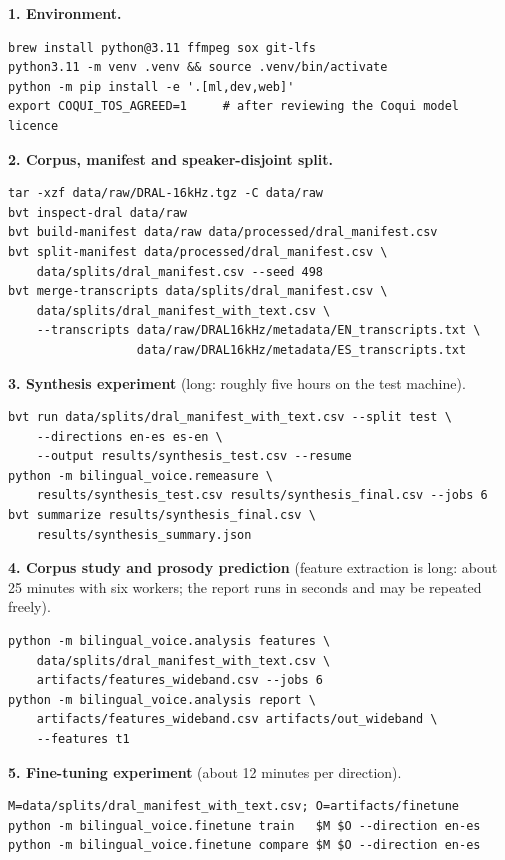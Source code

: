 \vspace{0.4\baselineskip}
{\singlespacing\small
\noindent\textbf{1. Environment.}
{\footnotesize\begin{verbatim}
brew install python@3.11 ffmpeg sox git-lfs
python3.11 -m venv .venv && source .venv/bin/activate
python -m pip install -e '.[ml,dev,web]'
export COQUI_TOS_AGREED=1     # after reviewing the Coqui model licence
\end{verbatim}}

\noindent\textbf{2. Corpus, manifest and speaker-disjoint split.}
{\footnotesize\begin{verbatim}
tar -xzf data/raw/DRAL-16kHz.tgz -C data/raw
bvt inspect-dral data/raw
bvt build-manifest data/raw data/processed/dral_manifest.csv
bvt split-manifest data/processed/dral_manifest.csv \
    data/splits/dral_manifest.csv --seed 498
bvt merge-transcripts data/splits/dral_manifest.csv \
    data/splits/dral_manifest_with_text.csv \
    --transcripts data/raw/DRAL16kHz/metadata/EN_transcripts.txt \
                  data/raw/DRAL16kHz/metadata/ES_transcripts.txt
\end{verbatim}}

\noindent\textbf{3. Synthesis experiment} (long: roughly five hours on the test machine).
{\footnotesize\begin{verbatim}
bvt run data/splits/dral_manifest_with_text.csv --split test \
    --directions en-es es-en \
    --output results/synthesis_test.csv --resume
python -m bilingual_voice.remeasure \
    results/synthesis_test.csv results/synthesis_final.csv --jobs 6
bvt summarize results/synthesis_final.csv \
    results/synthesis_summary.json
\end{verbatim}}

\noindent\textbf{4. Corpus study and prosody prediction} (feature extraction is long: about
25 minutes with six workers; the report runs in seconds and may be repeated freely).
{\footnotesize\begin{verbatim}
python -m bilingual_voice.analysis features \
    data/splits/dral_manifest_with_text.csv \
    artifacts/features_wideband.csv --jobs 6
python -m bilingual_voice.analysis report \
    artifacts/features_wideband.csv artifacts/out_wideband \
    --features t1
\end{verbatim}}

\noindent\textbf{5. Fine-tuning experiment} (about 12 minutes per direction).
{\footnotesize\begin{verbatim}
M=data/splits/dral_manifest_with_text.csv; O=artifacts/finetune
python -m bilingual_voice.finetune train   $M $O --direction en-es
python -m bilingual_voice.finetune compare $M $O --direction en-es
\end{verbatim}}

}
